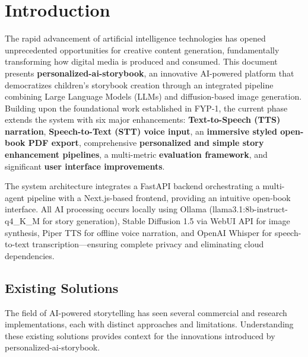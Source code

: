 \chapter{Introduction}
\label{sec:introduction}

The rapid advancement of artificial intelligence technologies has opened unprecedented opportunities for creative content generation, fundamentally transforming how digital media is produced and consumed. This document presents \textbf{personalized-ai-storybook}, an innovative AI-powered platform that democratizes children's storybook creation through an integrated pipeline combining Large Language Models (LLMs) and diffusion-based image generation. Building upon the foundational work established in FYP-1, the current phase extends the system with six major enhancements: \textbf{Text-to-Speech (TTS) narration}, \textbf{Speech-to-Text (STT) voice input}, an \textbf{immersive styled open-book PDF export}, comprehensive \textbf{personalized and simple story enhancement pipelines}, a multi-metric \textbf{evaluation framework}, and significant \textbf{user interface improvements}.

The system architecture integrates a FastAPI backend orchestrating a multi-agent pipeline with a Next.js-based frontend, providing an intuitive open-book interface. All AI processing occurs locally using Ollama (llama3.1:8b-instruct-q4\_K\_M for story generation), Stable Diffusion 1.5 via WebUI API for image synthesis, Piper TTS for offline voice narration, and OpenAI Whisper for speech-to-text transcription—ensuring complete privacy and eliminating cloud dependencies.


\section{Existing Solutions}

The field of AI-powered storytelling has seen several commercial and research implementations, each with distinct approaches and limitations. Understanding these existing solutions provides context for the innovations introduced by personalized-ai-storybook.

